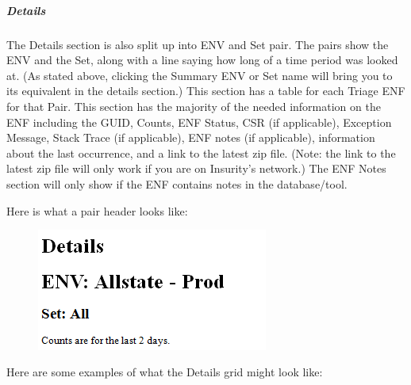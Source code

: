 \documentclass[a4paper,12pt]{report}
\begin{document}


\vspace{12pt}
 \par
\subparagraph*{Details}
 \par
The Details section is also split up into ENV and Set pair. The pairs show the ENV and the Set, along with a line saying how long of a time period was looked at. (As stated above, clicking the Summary ENV or Set name will bring you to its equivalent in the details section.) This section has a table for each Triage ENF for that Pair. This section has the majority of the needed information on the ENF including the GUID, Counts, ENF Status, CSR (if applicable), Exception Message, Stack Trace (if applicable), ENF notes (if applicable), information about the last occurrence, and a link to the latest zip file. (Note: the link to the latest zip file will only work if you are on Insurity’s network.) The ENF Notes section will only show if the ENF contains notes in the database/tool.  \par
Here is what a pair header looks like: \par




\begin{figure}[H]
\begin{center}
\includegraphics[width=2.99in,height=1.58in]{./uploads_new/ENF_Alert_Emails.docx_DIR/media/image2.png}
\end{center}
\end{figure}




\vspace{12pt}
Here are some examples of what the Details grid might look like: \par


\end{document}
